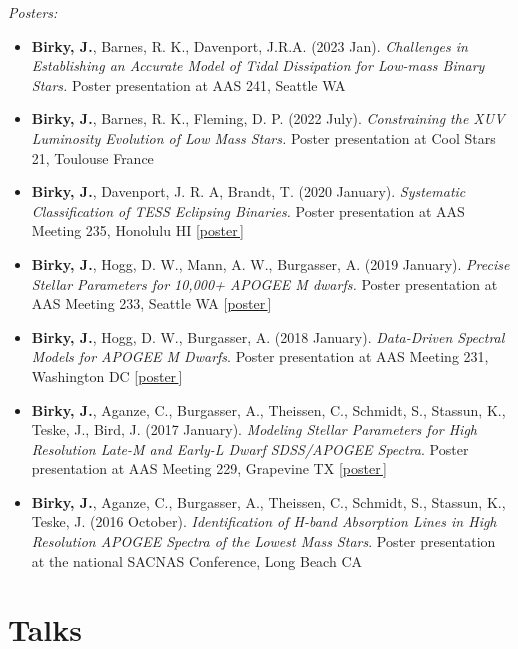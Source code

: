 \documentclass[a4,10.5pt]{article}
\let\orighref\href
\renewcommand{\href}[2]{\orighref{#1}{#2\,\scriptsize\faExternalLink}}
\begin{document}
\textsl{Posters:} 
\begin{itemize}[itemsep=0pt]
    \item \textbf{Birky, J.}, Barnes, R. K., Davenport, J.R.A. (2023 Jan). \textsl{Challenges in Establishing an Accurate Model of Tidal Dissipation for Low-mass Binary Stars.} Poster presentation at AAS 241, Seattle WA 
    \item \textbf{Birky, J.}, Barnes, R. K., Fleming, D. P. (2022 July). \textsl{Constraining the XUV Luminosity Evolution of Low Mass Stars.} Poster presentation at Cool Stars 21, Toulouse France 
    \item \textbf{Birky, J.}, Davenport, J. R. A, Brandt, T. (2020 January). \textsl{Systematic Classification of TESS Eclipsing Binaries.} Poster presentation at AAS Meeting 235, Honolulu HI [\href{https://doi.org/10.5281/zenodo.3605647}{poster}] 
    \item \textbf{Birky, J.}, Hogg, D. W., Mann, A. W., Burgasser, A. (2019 January). \textsl{Precise Stellar Parameters for 10,000+ APOGEE M dwarfs.} Poster presentation at AAS Meeting 233, Seattle WA [\href{https://doi.org/10.5281/zenodo.2536586}{poster}] 
    \item \textbf{Birky, J.}, Hogg, D. W., Burgasser, A. (2018 January). \textit{Data-Driven Spectral Models for APOGEE M Dwarfs}. Poster presentation at AAS Meeting 231, Washington DC [\href{http://doi.org/10.5281/zenodo.1146909}{poster}] 
    \item \textbf{Birky, J.}, Aganze, C., Burgasser, A., Theissen, C., Schmidt, S., Stassun, K.,  Teske, J., Bird, J. (2017 January). \textsl{Modeling Stellar Parameters for High Resolution Late-M and Early-L Dwarf SDSS/APOGEE Spectra}. Poster presentation at AAS Meeting 229, Grapevine TX [\href{http://doi.org/10.5281/zenodo.1116625}{poster}]  
    \item \textbf{Birky, J.}, Aganze, C., Burgasser, A., Theissen, C., Schmidt, S., Stassun, K.,  Teske, J. (2016 October). \textsl{Identification of H-band Absorption Lines in High Resolution APOGEE Spectra of the Lowest Mass Stars}. Poster presentation at the national SACNAS Conference, Long Beach CA 
\end{itemize}


\section{Talks}
\end{document}
